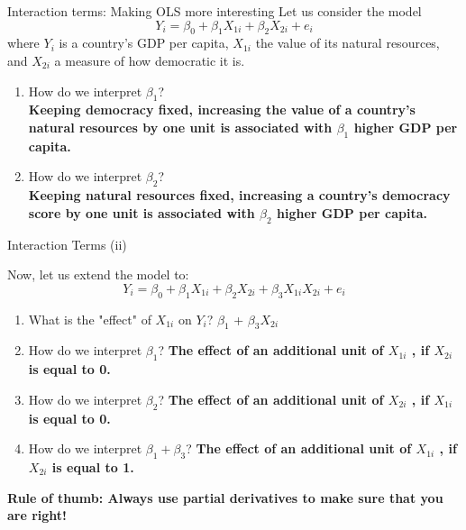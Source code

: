 \documentclass[11pt]{beamer}
\begin{document}
\begin{frame}{Interaction terms: Making OLS more interesting}
 Let us consider the model
        $$ Y_i = \beta_0 + \beta_1 X_{1i} + \beta_2 X_{2i}  
        +   e_i $$
        where $Y_i$ is a country's GDP per capita, $X_{1i}$ the value of its natural resources, and $X_{2i}$ a measure of how democratic it is.
        \begin{enumerate}
            \item How do we interpret $\beta_1$? \\ \pause 
            \textbf{Keeping democracy fixed, increasing the value of a country's natural resources by one unit is associated with $\beta_1$ higher GDP per capita.}
            \item How do we interpret $\beta_2$? \\ \pause 
            \textbf{Keeping natural resources fixed, increasing a country's democracy score by one unit  is associated with $\beta_2$ higher GDP per capita.}
        \end{enumerate}

 \end{frame}
 
 \begin{frame}{Interaction Terms (ii)}
 
 Now, let us extend the model to:
        $$ Y_i = \beta_0 + \beta_1 X_{1i} + \beta_2 X_{2i}  
        + \beta_3 X_{1i}  X_{2i}
        +   e_i $$
        \begin{enumerate}
         \item What is the "effect" of $X_{1i}$ on $Y_i$?  \pause $\beta_1$ + $\beta_3 X_{2i}$
         \pause
            \item How do we interpret $\beta_1$?  \pause \textbf{The effect of an additional unit of $X_{1i}$ {\color{orange}, if $X_{2i}$ is equal to 0}.}
        \pause
            \item How do we interpret $\beta_2$? \pause  \textbf{The effect of an additional unit of $X_{2i}$ {\color{orange}, if $X_{1i}$ is equal to 0}.}
            \pause
            \item How do we interpret $\beta_1 + \beta_3$?  \pause  \textbf{The effect of an additional unit of $X_{1i}$ {\color{orange}, if $X_{2i}$ is equal to 1}.}
            
        \end{enumerate}


{\textbf{\color{TolLightBlue} Rule of thumb: Always use partial derivatives to make sure that you are right!}}

\end{frame}
\end{document}
